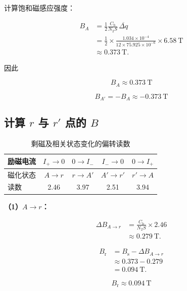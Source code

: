 \documentclass[UTF8,a4paper,12pt,fontset=none]{ctexart}
\newcommand{\Cb}{C_{\mathrm b}}
\newcommand{\Iplus}{I_{+}}
\newcommand{\Iminus}{I_{-}}
\begin{document}
计算饱和磁感应强度：

\begin{align*}
B_A
&=\frac12\frac{\Cb}{N_2S}
\,\overline{\Delta q}\\
&=\frac12
\times
\frac{1.034\times10^{-4}}
{12\times75.925\times10^{-6}}
\times6.58\ \mathrm T\\
&\approx0.373\ \mathrm T.
\end{align*}

因此

\[
\boxed{B_A\approx0.373\ \mathrm T}
\]

\[
\boxed{B_{A'}=-B_A\approx-0.373\ \mathrm T}
\]


\subsection{计算 $r$ 与 $r'$ 点的 $B$}

\begin{table}[H]
\centering

\caption{剩磁及相关状态变化的偏转读数}

\begin{tabular}{lcccc}
\toprule

励磁电流
& $\Iplus\to0$
& $0\to\Iminus$
& $\Iminus\to0$
& $0\to\Iplus$
\\
\midrule

磁化状态
& $A\to r$
& $r\to A'$
& $A'\to r'$
& $r'\to A$
\\

读数
& 2.46
& 3.97
& 2.51
& 3.94
\\

\bottomrule
\end{tabular}
\end{table}

\noindent
\textbf{（1）$A\to r$：}

\begin{align*}
\Delta B_{A\to r}
&=\frac{\Cb}{N_2S}\times2.46\\
&\approx0.279\ \mathrm T.
\end{align*}

\begin{align*}
B_{\mathrm r}
&=B_{\mathrm s}-\Delta B_{A\to r}\\
&\approx0.373-0.279\\
&=0.094\ \mathrm T.
\end{align*}

\[
\boxed{B_{\mathrm r}\approx0.094\ \mathrm T}
\]
\end{document}
